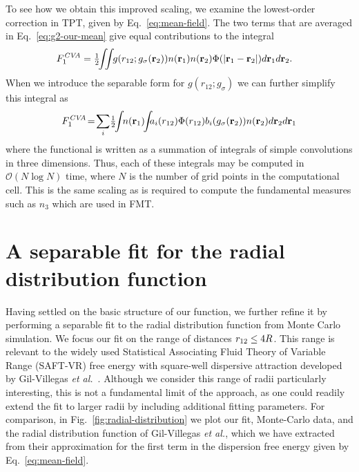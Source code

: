 To see how we obtain this improved scaling, we examine the
lowest-order correction in TPT, given by Eq.~\ref{eq:mean-field}.  The
two terms that are averaged in Eq.~\ref{eq:g2-our-mean} give equal
contributions to the integral
\begin{align}
  F_1^{\textit{CVA}} &= \tfrac12 \!\! \iint \!\!
  g(r_{12};g_\sigma(\textbf{r}_2))n(\textbf{r}_1)n(\textbf{r}_2)\Phi(|\textbf{r}_1-\textbf{r}_2|)
  d\textbf{r}_1d\textbf{r}_2.
\end{align}
When we introduce the separable form for $g(r_{12};g_\sigma)$ we can
further simplify this integral as
\begin{align}
  F_1^{\textit{CVA}} \! = \!
  \sum_i \!\tfrac12 \!\! \int \!\! n(\rr_1) \!\!
                            \int \!\!\!
                            a_i(r_{12})\Phi(r_{12})
                            b_i(
g_\sigma(\rr_2))n(\rr_2)
  d\rr_2d\rr_1
\end{align}
where the functional is written as a summation of integrals of simple
convolutions in three dimensions.  Thus, each of these integrals may
be computed in $\mathcal{O}(N\log N)$ time, where $N$ is the number of
grid points in the computational cell.  This is the same scaling as is
required to compute the fundamental measures such as $n_3$ which are
used in FMT.

\section{A separable fit for the radial distribution function}\label{sec:separable-fit}

Having settled on the basic structure of our function, we further
refine it by performing a separable fit to the radial distribution
function from Monte Carlo simulation.  We focus our fit on
the range of distances $r_{12} \le 4 R$.  This range is
relevant to the widely used \cite{chapman1989saft,
  muller2001molecular, tan2008recent} Statistical
Associating Fluid Theory of Variable Range (SAFT-VR) free energy with
square-well dispersive attraction developed by Gil-Villegas \emph{et
  al.}~\cite{gil1997statistical}.
%
Although we consider this range of radii particularly interesting,
this is not a fundamental limit of the approach, as one could readily
extend the fit to larger radii by including additional fitting
parameters.
%
For comparison, in Fig.~\ref{fig:radial-distribution} we plot our fit,
Monte-Carlo data, and the radial distribution function of Gil-Villegas
\emph{et al.}, which we have extracted from their approximation for
the first term in the dispersion free energy given by
Eq.~\ref{eq:mean-field}.

